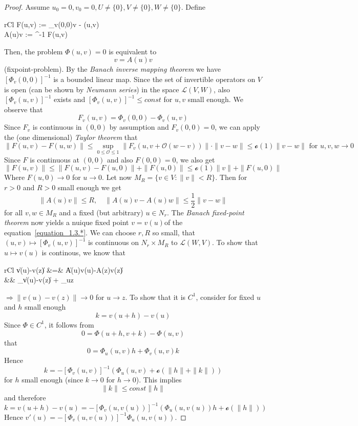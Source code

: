 \begin{proof}
	Assume $u_0=0, v_0=0, U\not=\{0\}, V\not=\{0\}, W\not=\{0\}$. Define 
	\begin{IEEEeqnarray*}{rCl}
		F(u,v) := \Phi_v(0,0)v - \Phi(u,v) \nonumber \\
		A(u)v := ^{-1} F(u,v) 
	\end{IEEEeqnarray*}
	Then, the problem $\Phi(u,v) = 0$ is equivalent to 
	\begin{equation}\label{equation_1.3.*}
		v = A(u)v
	\end{equation}
	 (fixpoint-problem). By the \emph{Banach inverse mapping theorem} we have $\left[\Phi_v(0,0)\right]^{-1}$ is a bounded linear map. Since the set of invertible operators on $V$ is open (can be shown by \emph{Neumann series}) in the space $\mathcal{L}(V,W)$, also $\left[\Phi_v(u,v)\right]^{-1}$ exists and $\left[\Phi_v(u,v)\right]^{-1}\leq const$ for $u,v$ small enough.\newline\noindent
	We observe that 
	\[
		F_v(u,v) = \Phi_v(0,0) - \Phi_v(u,v)
	\]
	Since $F_v$ is continuous in $(0,0)$ by assumption and $F_v(0,0) = 0$, we can apply the (one dimensional) \emph{Taylor theorem} that
	\[
		\|F(u,v)-F(u,w)\| \leq \sup_{0\leq\mathcal{O}\leq 1} \|F_v(u,v+\mathcal{O}(w-v))\|\cdot\|v-w\| \leq \mathcal{o}(1)\|v-w\|\text{ for } u,v,w\to 0
	\]
	Since $F$ is continuous at $(0,0)$ and also $F(0,0) = 0$, we also get
	\[
		\|F(u,v)\| \leq \|F(u,v)-F(u,0)\| + \|F(u,0)\| \leq \mathcal{o}(1)\|v\| + \|F(u,0)\|
	\]
	Where $F(u,0)\to 0$ for $u\to 0$. Let now $M_R=\{v\in V:\|v\| < R\}$. Then for $r>0$ and $R>0$ small enough we get
	\[
		\|A(u)v\|\leq R,\quad\|A(u)v-A(u)w\|\leq\frac{1}{2}\|v-w\|
	\] 
	for all $v,w\in M_R$ and a fixed (but arbitrary) $u\in N_r$. The \emph{Banach fixed-point theorem} now yields a nuique fixed point $v = v(u)$of the equation~\ref{equation_1.3.*}. \newline\noindent
	We can choose $r,R$ so small, that $(u,v)\mapsto\left[\Phi_v(u,v)\right]^{-1}$ is continuous on $N_r\times M_R$ to $\mathcal{L}(W,V)$. To show that $u\mapsto v(u)$ is continous, we know that
	\begin{IEEEeqnarray}{rCl}
		\|v(u)-v(z)\| &=& \|A(u)v(u)-A(z)v(z)\| \nonumber\\
		&& _{\leq{}\|v(u)-v(z)\|} + _{u\to z} \nonumber
	\end{IEEEeqnarray}
	$\Rightarrow \|v(u)-v(z)\|\to 0$ for $u\to z$. To show that it is $C^1$, consider for fixed $u$ and $h$ small enough
	\[
		k= v(u+h)-v(u)
	\]
	Since $\Phi\in C^1$, it follows from
	\[
		0 = \Phi(u+h,v+k) - \Phi(u,v)
	\]
	that
	\[
		0 = \Phi_u(u,v)h + \Phi_v(u,v)k
	\]
	Hence 
	\[
		k = - \left[\Phi_v(u,v)\right]^{-1}\left(\Phi_u(u,v) + \mathcal{o}(\|h\|+\|k\|)\right)
	\]
	for $h$ small enough (since $k\to 0$ for $h\to 0$). This implies
	\[
		\|k\|\leq const\|h\|
	\]
	and therefore 
	\[
		k = v(u+h)-v(u) = -\left[\Phi_v(u,v(u))\right]^{-1}\left(\Phi_u(u,v(u))h+\mathcal{o}(\|h\|)\right)
	\]
	Hence $v'(u) = -\left[\Phi_v(u,v(u))\right]^{-1}\Phi_u(u,v(u))$. 
\end{proof}


